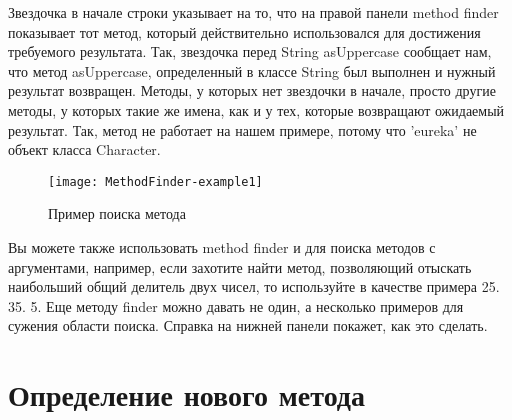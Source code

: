 \documentclass[a4paper,10pt,twoside]{book}
\begin{document}
Звездочка в начале строки указывает  на то,  что на правой панели
method finder показывает тот метод, который действительно
использовался для достижения требуемого результата. Так, звездочка
перед String asUppercase сообщает нам, что метод asUppercase,
определенный в классе String был выполнен и нужный результат
возвращен. Методы, у которых нет звездочки в начале, просто другие
методы, у которых такие же имена, как и у тех, которые возвращают
ожидаемый результат.
Так, метод  не работает на нашем примере,
потому что 'eureka' не объект класса Character. 

\begin{figure}[hbt]
\centerline {\texttt{[image: MethodFinder-example1]}}
\caption{Пример поиска метода
}
\end{figure}


Вы можете также использовать method finder и для поиска методов
с аргументами, например, если захотите найти метод, позволяющий
отыскать наибольший общий делитель двух чисел, то используйте в
качестве примера 25. 35. 5. Еще методу finder можно давать не один,
а несколько примеров для сужения области поиска. Справка на нижней
панели покажет, как это сделать. 

\section{Определение нового метода}

\end{document}
